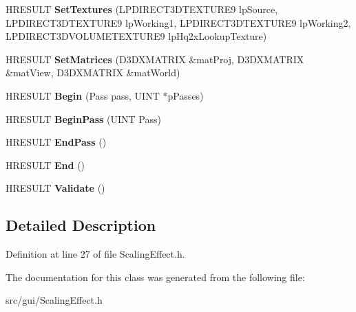 \begin{DoxyCompactItemize}
\item 
\hypertarget{classScalingEffect_a8fc22e965dca8a951139bbfa0b11d916}{H\-R\-E\-S\-U\-L\-T {\bfseries Set\-Textures} (L\-P\-D\-I\-R\-E\-C\-T3\-D\-T\-E\-X\-T\-U\-R\-E9 lp\-Source, L\-P\-D\-I\-R\-E\-C\-T3\-D\-T\-E\-X\-T\-U\-R\-E9 lp\-Working1, L\-P\-D\-I\-R\-E\-C\-T3\-D\-T\-E\-X\-T\-U\-R\-E9 lp\-Working2, L\-P\-D\-I\-R\-E\-C\-T3\-D\-V\-O\-L\-U\-M\-E\-T\-E\-X\-T\-U\-R\-E9 lp\-Hq2x\-Lookup\-Texture)}\label{classScalingEffect_a8fc22e965dca8a951139bbfa0b11d916}

\item 
\hypertarget{classScalingEffect_a58e49c69fe364474ba44a4cd02feb4a5}{H\-R\-E\-S\-U\-L\-T {\bfseries Set\-Matrices} (D3\-D\-X\-M\-A\-T\-R\-I\-X \&mat\-Proj, D3\-D\-X\-M\-A\-T\-R\-I\-X \&mat\-View, D3\-D\-X\-M\-A\-T\-R\-I\-X \&mat\-World)}\label{classScalingEffect_a58e49c69fe364474ba44a4cd02feb4a5}

\item 
\hypertarget{classScalingEffect_a5bd1b4333487b834a56df0bb9e48e52d}{H\-R\-E\-S\-U\-L\-T {\bfseries Begin} (Pass pass, U\-I\-N\-T $\ast$p\-Passes)}\label{classScalingEffect_a5bd1b4333487b834a56df0bb9e48e52d}

\item 
\hypertarget{classScalingEffect_a05551a3f64c97941857564dfe79a76fd}{H\-R\-E\-S\-U\-L\-T {\bfseries Begin\-Pass} (U\-I\-N\-T Pass)}\label{classScalingEffect_a05551a3f64c97941857564dfe79a76fd}

\item 
\hypertarget{classScalingEffect_ae527ffe8a7d40e896b15826bf9e15cb3}{H\-R\-E\-S\-U\-L\-T {\bfseries End\-Pass} ()}\label{classScalingEffect_ae527ffe8a7d40e896b15826bf9e15cb3}

\item 
\hypertarget{classScalingEffect_a3a5913238563aa5b08f675578f63a11d}{H\-R\-E\-S\-U\-L\-T {\bfseries End} ()}\label{classScalingEffect_a3a5913238563aa5b08f675578f63a11d}

\item 
\hypertarget{classScalingEffect_a8177702bdcb050162a52c45c4feab52d}{H\-R\-E\-S\-U\-L\-T {\bfseries Validate} ()}\label{classScalingEffect_a8177702bdcb050162a52c45c4feab52d}

\end{DoxyCompactItemize}


\subsection{Detailed Description}


Definition at line 27 of file Scaling\-Effect.\-h.



The documentation for this class was generated from the following file\-:\begin{DoxyCompactItemize}
\item 
src/gui/Scaling\-Effect.\-h\end{DoxyCompactItemize}
